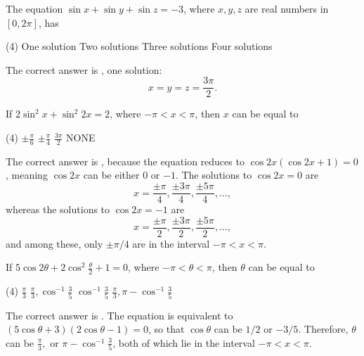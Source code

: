\begin{question}[name=2003 Orissa JEE]
    The equation $\sin x + \sin y + \sin z = -3$, where $x,y,z$ are real numbers in $[0,2\pi]$, has
    \begin{tasks}(4)
        \task \correct One solution
        \task  Two solutions
        \task Three solutions
        \task Four solutions
    \end{tasks}
\end{question}
\begin{solution}
    The correct answer is \correct, one solution: $$x=y=z=\frac{3\pi}{2}.$$
\end{solution}



\begin{question}[name=1989 ISM Dhanbad]
    If $2\sin^2 x + \sin^2 2x = 2$, where $-\pi<x<\pi$, then $x$ can be equal to
    \begin{tasks}(4)
        \task $\displaystyle \pm\frac{\pi}{6}$
        \task \correct $\displaystyle \pm\frac{\pi}{4}$
        \task $\displaystyle \frac{3\pi}{2}$
        \task NONE
    \end{tasks}
\end{question}
\begin{solution}
    The correct answer is \correct, because the equation reduces to $\cos 2x (\cos 2x+1)= 0$, meaning $\cos 2x$ can be either $0$ or $-1$. The solutions to $\cos 2x = 0$ are $$x=\frac{\pm \pi}{4}, \frac{\pm 3\pi}{4}, \frac{\pm 5\pi}{4}, \dots,$$
    whereas the solutions to $\cos 2x = -1$ are
    $$x=\frac{\pm \pi}{2}, \frac{\pm 3\pi}{2}, \frac{\pm 5\pi}{2}, \dots,$$
    and among these, only $\pm \pi/4$ are in the interval $-\pi < x < \pi$.
\end{solution}


\begin{question}[name=1984 Roorkee]
    If $5\cos 2\theta + 2\cos^2 \frac{\theta}{2} + 1 = 0$, where $-\pi<\theta<\pi$, then $\theta$ can be equal to
    \begin{tasks}(4)
        \task $\displaystyle \frac{\pi}{3}$
        \task $\displaystyle \frac{\pi}{3}, \cos^{-1} \frac{3}{5}$
        \task $\displaystyle \cos^{-1} \frac{3}{5}$
        \task \correct $\displaystyle \frac{\pi}{3}, \pi-\cos^{-1} \frac{3}{5}$
    \end{tasks}
\end{question}
\begin{solution}
    The correct answer is \correct. The equation is equivalent to $(5\cos\theta + 3)(2\cos \theta -1)=0$, so that $\cos \theta$ can be $1/2$ or $-3/5$. Therefore, $\theta$ can be $\frac{\pi}{3},$ or  $\pi-\cos^{-1}\frac{3}{5}$, both of which lie in the interval $-\pi < x < \pi$.
\end{solution}




